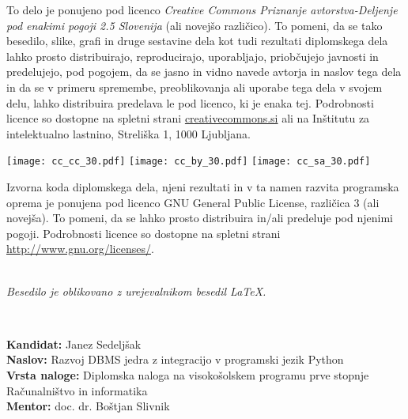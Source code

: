 \documentclass[a4paper,12pt,openright]{book}
\newcommand{\ttitle}{Razvoj DBMS jedra z integracijo v programski jezik Python}
\newcommand{\clearemptydoublepage}{\newpage{\pagestyle{empty}\cleardoublepage}}
\newcommand{\CcImageCc}[1]{%
	\texttt{[image: cc\_cc\_30.pdf]}%
}
\newcommand{\CcImageBy}[1]{%
	\texttt{[image: cc\_by\_30.pdf]}%
}
\newcommand{\CcImageSa}[1]{%
	\texttt{[image: cc\_sa\_30.pdf]}%
}
\begin{document}
\newpage
\thispagestyle{empty}

\vspace*{5cm}
{\small \noindent
To delo je ponujeno pod licenco \textit{Creative Commons Priznanje avtorstva-Deljenje pod enakimi pogoji 2.5 Slovenija} (ali novej\v so razli\v cico).
To pomeni, da se tako besedilo, slike, grafi in druge sestavine dela kot tudi rezultati diplomskega dela lahko prosto distribuirajo,
reproducirajo, uporabljajo, priobčujejo javnosti in predelujejo, pod pogojem, da se jasno in vidno navede avtorja in naslov tega
dela in da se v primeru spremembe, preoblikovanja ali uporabe tega dela v svojem delu, lahko distribuira predelava le pod
licenco, ki je enaka tej.
Podrobnosti licence so dostopne na spletni strani \href{http://creativecommons.si}{creativecommons.si} ali na Inštitutu za
intelektualno lastnino, Streliška 1, 1000 Ljubljana.

\vspace*{1cm}
\begin{center}%
\CcImageCc{0.741573033707865}\hspace*{1ex}\CcImageBy{1}\hspace*{1ex}\CcImageSa{1}%
\end{center}
}

\vspace*{1cm}
{\small \noindent
Izvorna koda diplomskega dela, njeni rezultati in v ta namen razvita programska oprema je ponujena pod licenco GNU General Public License,
različica 3 (ali novejša). To pomeni, da se lahko prosto distribuira in/ali predeluje pod njenimi pogoji.
Podrobnosti licence so dostopne na spletni strani \url{http://www.gnu.org/licenses/}.
}

\vfill
\begin{center} 
\ \\ \vfill
{\em
Besedilo je oblikovano z urejevalnikom besedil \LaTeX.}
\end{center}

\clearemptydoublepage

\thispagestyle{empty}
\
\vfill

\bigskip
\noindent\textbf{Kandidat:} Janez Sedeljšak\\
\noindent\textbf{Naslov:} \ttitle \\
\noindent\textbf{Vrsta naloge:} Diplomska naloga na visokošolskem programu prve stopnje Računalništvo in informatika \\
\noindent\textbf{Mentor:} doc. dr. Boštjan Slivnik\\
\end{document}
